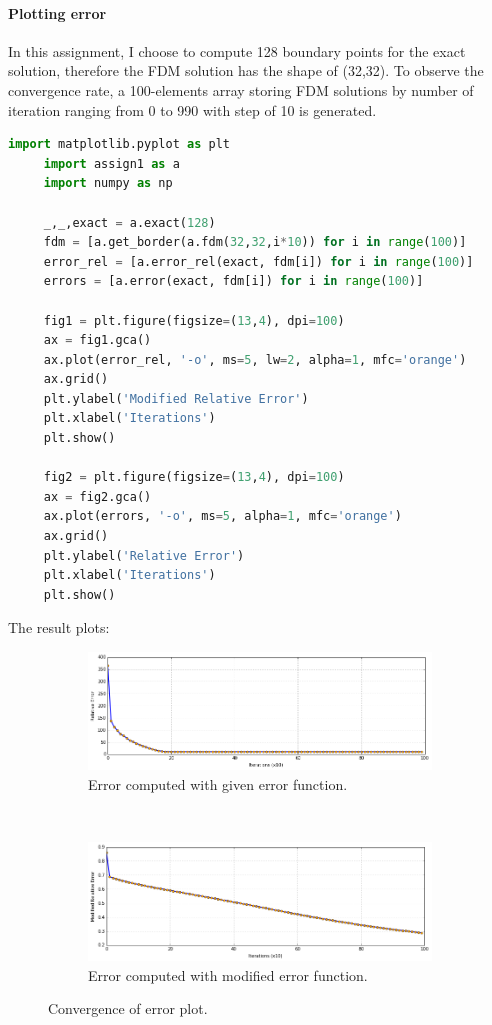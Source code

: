 \documentclass[a4paper,12pt]{article}
\begin{document}
\paragraph{Plotting error} In this assignment, I choose to compute 128 boundary points for the exact solution, therefore the FDM solution has the shape of (32,32). To observe the convergence rate, a 100-elements array storing FDM solutions by number of iteration ranging from 0 to 990 with step of 10 is generated.

\begin{lstlisting}[language=Python, caption={Error plot}, label={lst:errors}]
     import matplotlib.pyplot as plt
     import assign1 as a
     import numpy as np

     _,_,exact = a.exact(128)
     fdm = [a.get_border(a.fdm(32,32,i*10)) for i in range(100)]
     error_rel = [a.error_rel(exact, fdm[i]) for i in range(100)]
     errors = [a.error(exact, fdm[i]) for i in range(100)]

     fig1 = plt.figure(figsize=(13,4), dpi=100)
     ax = fig1.gca()
     ax.plot(error_rel, '-o', ms=5, lw=2, alpha=1, mfc='orange')
     ax.grid()
     plt.ylabel('Modified Relative Error')
     plt.xlabel('Iterations')
     plt.show()

     fig2 = plt.figure(figsize=(13,4), dpi=100)
     ax = fig2.gca()
     ax.plot(errors, '-o', ms=5, alpha=1, mfc='orange')
     ax.grid()
     plt.ylabel('Relative Error')
     plt.xlabel('Iterations')
     plt.show() 
\end{lstlisting}

The result plots:
\begin{figure}[h!]
  \centering
  \begin{subfigure}[b]{\textwidth}
    \includegraphics[width=\textwidth]{hpsc_a1_error.png}
    \caption{Error computed with given error function.}
  \end{subfigure}
~
\begin{subfigure}[b]{\textwidth}
    \includegraphics[width=\textwidth]{hpsc_a1_error_rel.png}
    \caption{Error computed with modified error function.}
  \end{subfigure}
  \caption{Convergence of error plot.}
\end{figure}
\end{document}
